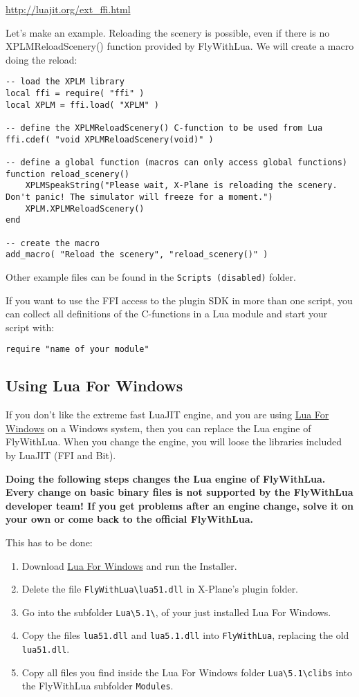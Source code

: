 \documentclass[11pt,parskip=half,a4paper]{scrartcl}
\begin{document}
\url{http://luajit.org/ext_ffi.html}

Let's make an example. Reloading the scenery is possible, even if there is no XPLMReloadScenery() function provided by FlyWithLua. We will create a macro doing the reload:

\begin{lstlisting}[firstnumber=12]
-- load the XPLM library
local ffi = require( "ffi" )
local XPLM = ffi.load( "XPLM" )

-- define the XPLMReloadScenery() C-function to be used from Lua
ffi.cdef( "void XPLMReloadScenery(void)" )

-- define a global function (macros can only access global functions)
function reload_scenery()
    XPLMSpeakString("Please wait, X-Plane is reloading the scenery. Don't panic! The simulator will freeze for a moment.")
    XPLM.XPLMReloadScenery()
end

-- create the macro
add_macro( "Reload the scenery", "reload_scenery()" )
\end{lstlisting}

Other example files can be found in the \verb|Scripts (disabled)| folder.

If you want to use the FFI access to the plugin SDK in more than one script, you can collect all definitions of the C-functions in a Lua module and start your script with:

\verb|require "name of your module"|

\newpage
\subsection{Using Lua For Windows}

If you don't like the extreme fast LuaJIT engine, and you are using \href{http://code.google.com/p/luaforwindows/}{Lua For Windows} on a Windows system, then you can replace the Lua engine of FlyWithLua. When you change the engine, you will loose the libraries included by LuaJIT (FFI and Bit).

\textbf{Doing the following steps changes the Lua engine of FlyWithLua. Every change on basic binary files is not supported by the FlyWithLua developer team! If you get problems after an engine change, solve it on your own or come back to the official FlyWithLua.}

This has to be done:

\begin{enumerate}
\item Download \href{http://code.google.com/p/luaforwindows/}{Lua For Windows} and run the Installer.
\item Delete the file \verb|FlyWithLua\lua51.dll| in X-Plane's plugin folder.
\item Go into the subfolder \verb|Lua\5.1\|, of your just installed Lua For Windows.
\item Copy the files \verb|lua51.dll| and \verb|lua5.1.dll| into \verb|FlyWithLua|, replacing the old \verb|lua51.dll|.
\item Copy all files you find inside the Lua For Windows folder \verb|Lua\5.1\clibs| into the FlyWithLua subfolder \verb|Modules|.
\end{enumerate}
\end{document}
